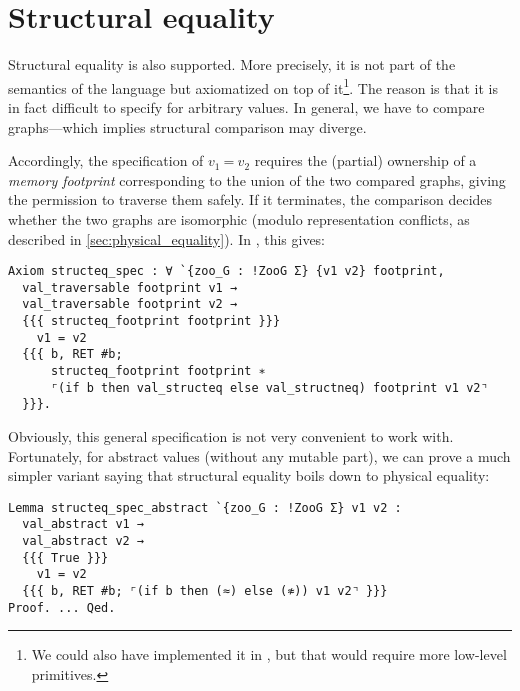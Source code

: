 \section{Structural equality}
\label{sec:structural_equality}

Structural equality is also supported.
More precisely, it is not part of the semantics of the language but axiomatized on top of it\footnote{We could also have implemented it in \ZooLang, but that would require more low-level primitives.}.
The reason is that it is in fact difficult to specify for arbitrary values.
In general, we have to compare graphs---which implies structural comparison may diverge.

Accordingly, the specification of $v_1\ \texttt{=}\ v_2$ requires the (partial) ownership of a \emph{memory footprint} corresponding to the union of the two compared graphs, giving the permission to traverse them safely.
If it terminates, the comparison decides whether the two graphs are isomorphic (modulo representation conflicts, as described in \cref{sec:physical_equality}).
In \Iris, this gives:

\begin{verbatim}
Axiom structeq_spec : ∀ `{zoo_G : !ZooG Σ} {v1 v2} footprint,
  val_traversable footprint v1 →
  val_traversable footprint v2 →
  {{{ structeq_footprint footprint }}}
    v1 = v2
  {{{ b, RET #b;
      structeq_footprint footprint ∗
      ⌜(if b then val_structeq else val_structneq) footprint v1 v2⌝
  }}}.
\end{verbatim}

Obviously, this general specification is not very convenient to work with.
Fortunately, for abstract values (without any mutable part), we can prove a much simpler variant saying that structural equality boils down to physical equality:

\begin{verbatim}
Lemma structeq_spec_abstract `{zoo_G : !ZooG Σ} v1 v2 :
  val_abstract v1 →
  val_abstract v2 →
  {{{ True }}}
    v1 = v2
  {{{ b, RET #b; ⌜(if b then (≈) else (≉)) v1 v2⌝ }}}
Proof. ... Qed.
\end{verbatim}